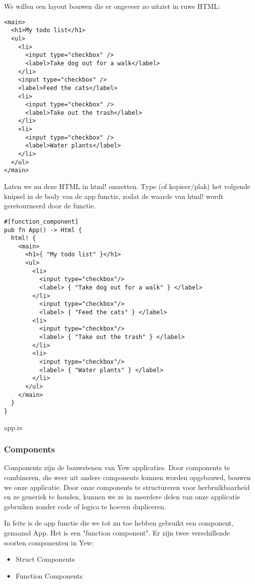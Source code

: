 We willen een layout bouwen die er ongeveer zo uitziet in ruwe HTML:

\begin{verbatim}
<main>
  <h1>My todo list</h1>
  <ul>
    <li>
      <input type="checkbox" />
      <label>Take dog out for a walk</label>
    </li>
    <input type="checkbox" />
    <label>Feed the cats</label>
    <li>
      <input type="checkbox" />
      <label>Take out the trash</label>
    </li>
    <li>
      <input type="checkbox" />
      <label>Water plants</label>
    </li>
  </ul>
</main>
\end{verbatim}

\clearpage

Laten we nu deze HTML in html! omzetten. Type (of kopieer/plak) het volgende knipsel in de body van
de app functie, zodat de waarde van html! wordt geretourneerd door de functie.

\begin{listing}[h]
\begin{verbatim}
#[function_component]
pub fn App() -> Html {
  html! {
    <main>
      <h1>{ "My todo list" }</h1>
      <ul>
        <li>
          <input type="checkbox"/>
          <label> { "Take dog out for a walk" } </label>
        </li>
          <input type="checkbox"/>
          <label> { "Feed the cats" } </label>
        <li>
          <input type="checkbox"/>
          <label> { "Take out the trash" } </label>
        </li>
        <li>
          <input type="checkbox"/>
          <label> { "Water plants" } </label>
        </li>
      </ul>
    </main>
  }
}
\end{verbatim}
\caption{app.rs}
\end{listing}

\clearpage

\subsubsection{Components}

Components zijn de bouwstenen van Yew applicaties. Door components te combineren, die weer uit
andere components kunnen worden opgebouwd, bouwen we onze applicatie. Door onze components te
structureren voor herbruikbaarheid en ze generiek te houden, kunnen we ze in meerdere delen van onze
applicatie gebruiken zonder code of logica te hoeven dupliceren.

In feite is de app functie die we tot nu toe hebben gebruikt een component, genaamd App. Het is een
"function component". Er zijn twee verschillende soorten componenten in Yew:
\begin{itemize}
  \item Struct Components 
  \item Function Components
\end{itemize}

